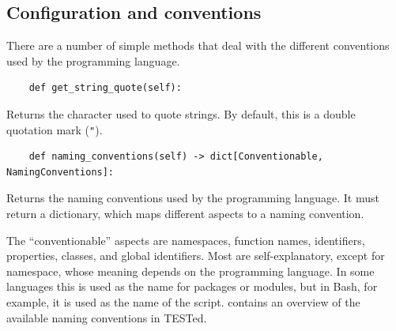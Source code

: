 \documentclass[../main]{subfiles}
\begin{document}
\subsection{Configuration and conventions}\label{subsec:configuration-and-conventions}

There are a number of simple methods that deal with the different conventions used by the programming language.

\begin{verbatim}
    def get_string_quote(self):
\end{verbatim}

Returns the character used to quote strings.
By default, this is a double quotation mark (\texttt{"}).

\begin{verbatim}
    def naming_conventions(self) -> dict[Conventionable, NamingConventions]:
\end{verbatim}

Returns the naming conventions used by the programming language.
It must return a dictionary, which maps different aspects to a naming convention.

The ``conventionable'' aspects are namespaces, function names, identifiers, properties, classes, and global identifiers.
Most are self-explanatory, except for namespace, whose meaning depends on the programming language.
In some languages this is used as the name for packages or modules, but in Bash, for example, it is used as the name of the script.
 contains an overview of the available naming conventions in TESTed.
\end{document}

